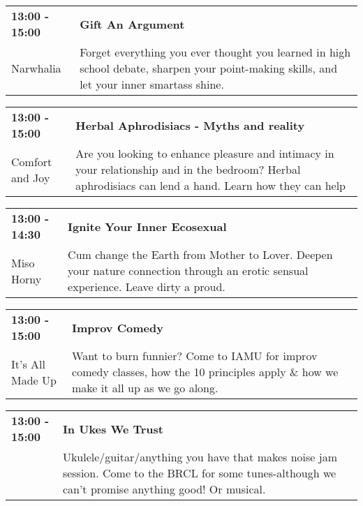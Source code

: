 \begin{tabular}{ p{1in} p{2.2in} }
    \textbf{13:00 - 15:00} & \textbf{Gift An Argument} \\
    Narwhalia \newline  & Forget everything you ever thought you learned in high school debate, sharpen your point-making skills, and let your inner smartass shine. \\
    \hline 
\end{tabular}
    
\begin{tabular}{ p{1in} p{2.2in} }
    \textbf{13:00 - 15:00} & \textbf{Herbal Aphrodisiacs - Myths and reality} \\
    Comfort and Joy \newline  & Are you looking to enhance pleasure and intimacy in your relationship and in the bedroom? Herbal aphrodisiacs can lend a hand. Learn how they can help \\
    \hline 
\end{tabular}
    
\begin{tabular}{ p{1in} p{2.2in} }
    \textbf{13:00 - 14:30} & \textbf{Ignite Your Inner Ecosexual} \\
    Miso Horny \newline  & Cum change the Earth from Mother to Lover. Deepen your nature connection through an erotic sensual experience. Leave dirty a proud. \\
    \hline 
\end{tabular}
    
\begin{tabular}{ p{1in} p{2.2in} }
    \textbf{13:00 - 15:00} & \textbf{Improv Comedy} \\
    It's All Made Up \newline  & Want to burn funnier? Come to IAMU for improv comedy classes, how the 10 principles apply \& how we make it all up as we go along. \\
    \hline 
\end{tabular}
    
\begin{tabular}{ p{1in} p{2.2in} }
    \textbf{13:00 - 15:00} & \textbf{In Ukes We Trust} \\
    ~ \newline  & Ukulele/guitar/anything you have that makes noise jam session.  Come to the BRCL for some tunes-although we can't promise anything good! Or musical. \\
    \hline 
\end{tabular}
    

